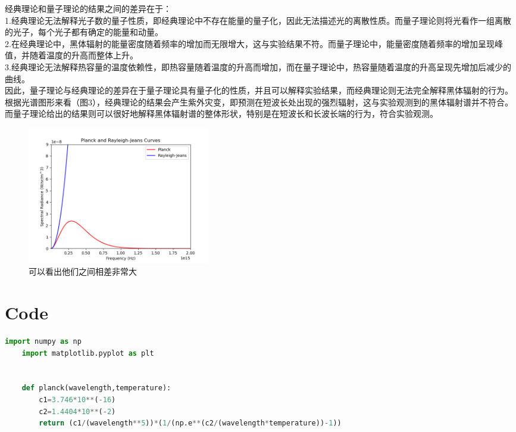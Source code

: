 \documentclass[12pt, a4paper, oneside]{article}
\begin{document}
\begin{spacing}{2.0}
经典理论和量子理论的结果之间的差异在于：\\

1.经典理论无法解释光子数的量子性质，即经典理论中不存在能量的量子化，因此无法描述光的离散性质。而量子理论则将光看作一组离散的光子，每个光子都有确定的能量和动量。\\

2.在经典理论中，黑体辐射的能量密度随着频率的增加而无限增大，这与实验结果不符。而量子理论中，能量密度随着频率的增加呈现峰值，并随着温度的升高而整体上升。\\

3.经典理论无法解释热容量的温度依赖性，即热容量随着温度的升高而增加，而在量子理论中，热容量随着温度的升高呈现先增加后减少的曲线。\\

因此，量子理论与经典理论的差异在于量子理论具有量子化的性质，并且可以解释实验结果，而经典理论则无法完全解释黑体辐射的行为。\\


根据光谱图形来看（图3），经典理论的结果会产生紫外灾变，即预测在短波长处出现的强烈辐射，这与实验观测到的黑体辐射谱并不符合。
而量子理论给出的结果则可以很好地解释黑体辐射谱的整体形状，特别是在短波长和长波长端的行为，符合实验观测。

\begin{figure}[H]
	\centering
	\includegraphics[width=8cm]{Figure_3 freq.png}
	\caption{可以看出他们之间相差非常大}
\end{figure}
\section{Code}

\begin{lstlisting}[language=Python, caption=planck]
    import numpy as np 
    import matplotlib.pyplot as plt 
    
    
    def planck(wavelength,temperature):
        c1=3.746*10**(-16)
        c2=1.4404*10**(-2)
        return (c1/(wavelength**5))*(1/(np.e**(c2/(wavelength*temperature))-1))
    

\end{lstlisting}
\end{spacing}
\end{document}
